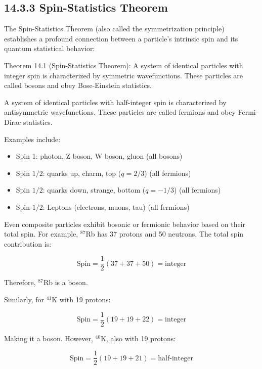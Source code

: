 \documentclass[10pt]{article}
\begin{document}
\subsection*{14.3.3 Spin-Statistics Theorem}
The Spin-Statistics Theorem (also called the symmetrization principle) establishes a profound connection between a particle's intrinsic spin and its quantum statistical behavior:

Theorem 14.1 (Spin-Statistics Theorem): A system of identical particles with integer spin is characterized by symmetric wavefunctions. These particles are called bosons and obey Bose-Einstein statistics.

A system of identical particles with half-integer spin is characterized by antisymmetric wavefunctions. These particles are called fermions and obey Fermi-Dirac statistics.

Examples include:
\begin{itemize}
  \item Spin 1: photon, Z boson, W boson, gluon (all bosons)
  \item Spin $1/2$: quarks up, charm, top ($q=2/3$) (all fermions)
  \item Spin $1/2$: quarks down, strange, bottom ($q=-1/3$) (all fermions)
  \item Spin $1/2$: Leptons (electrons, muons, tau) (all fermions)
\end{itemize}

Even composite particles exhibit bosonic or fermionic behavior based on their total spin. For example, $^{87}$Rb has 37 protons and 50 neutrons. The total spin contribution is:

\begin{equation*}
\text{Spin}=\frac{1}{2}(37+37+50)=\text{integer} \tag{14.28}
\end{equation*}

Therefore, $^{87}$Rb is a boson.

Similarly, for $^{41}$K with 19 protons:

\begin{equation*}
\text{Spin}=\frac{1}{2}(19+19+22)=\text{integer} \tag{14.29}
\end{equation*}

Making it a boson. However, $^{40}$K, also with 19 protons:

\begin{equation*}
\text{Spin}=\frac{1}{2}(19+19+21)=\text{half-integer} \tag{14.30}
\end{equation*}
\end{document}
